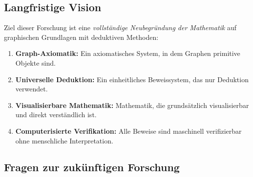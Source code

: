 \documentclass[12pt, a4paper]{article}
\theoremstyle{definition}
\theoremstyle{remark}
\begin{document}
\subsection{Langfristige Vision}
\label{subsec:langfristige_vision}

Ziel dieser Forschung ist eine \emph{vollständige Neubegründung der Mathematik} auf graphischen Grundlagen mit deduktiven Methoden:

\begin{enumerate}[label=(\roman*)]
  \item \textbf{Graph-Axiomatik:} Ein axiomatisches System, in dem Graphen primitive Objekte sind.
  
  \item \textbf{Universelle Deduktion:} Ein einheitliches Beweissystem, das nur Deduktion verwendet.
  
  \item \textbf{Visualisierbare Mathematik:} Mathematik, die grundsätzlich visualisierbar und direkt verständlich ist.
  
  \item \textbf{Computerisierte Verifikation:} Alle Beweise sind maschinell verifizierbar ohne menschliche Interpretation.
\end{enumerate}

\subsection{Fragen zur zukünftigen Forschung}
\label{subsec:zukuenftige_forschung}
\end{document}
